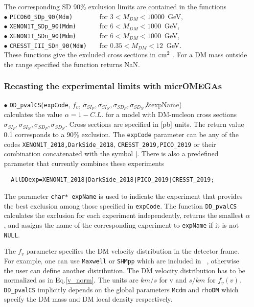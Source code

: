 \documentclass[12pt,a4paper]{article}
\begin{document}
The corresponding SD 90\% exclusion limits are contained in the functions\\

\noindent 
$\bullet$ \verb|PICO60_SDp_90(Mdm)       | for  $ 3 < M_{DM} < 10000$~GeV,  \cite{Amole:2019fdf} \\
\noindent
$\bullet$ \verb|XENON1T_SDp_90(Mdm)      | for  $ 6 <  M_{DM} < 1000$~GeV, \cite{Aprile:2019dbj} \\
\noindent
$\bullet$ \verb|XENON1T_SDn_90(Mdm)      | for  $ 6 <  M_{DM} < 1000$~GeV, \cite{Aprile:2019dbj} \\
\noindent
$\bullet$ \verb|CRESST_III_SDn_90(Mdm)   |  for $ 0.35 < M_{DM} < 12$~GeV. ~\cite{Abdelhameed:2019hmk}\\


These functions give the  excluded cross sections in ${\rm cm}^2$ . For a DM mass outside the range specified the function returns NaN.

\subsubsection{Recasting the experimental limits with  micrOMEGAs}  
\label{Recasting}


\noindent
$\bullet$ \verb|DD_pvalCS|(\verb|expCode|, $f_v$, $\sigma_{SI_P},\sigma_{SI_N},\sigma_{SD_P}, \sigma_{SD_N}$,\&expName)\\
calculates the  value $\alpha= 1-C.L.$  for a model with DM-nucleon cross sections 
$\sigma_{SI_P},\sigma_{SI_N},\sigma_{SD_P}, \sigma_{SD_N}$. Cross sections are specified in
[pb] units. The return value 0.1 corresponds to a 90\% exclusion.   
 The {\tt expCode} parameter can be any of the codes  \verb|XENON1T_2018,DarkSide_2018|, \verb|CRESST_2019,PICO_2019| or their combination concatenated with the symbol
$\mid$. There is also a predefined parameter that  currently combines these experiments 
\begin{verbatim}
  AllDDexp=XENON1T_2018|DarkSide_2018|PICO_2019|CRESST_2019;
\end{verbatim}

The parameter {\tt char* expName}  is used to indicate the   experiment that  provides
the best exclusion among those specified in  {\tt expCode}.   The function {\tt DD\_pvalCS } calculates the
exclusion for each experiment  independently, returns the smallest $\alpha$, and assigns the 
name of the corresponding experiment to  {\tt expName}  if it is not {\tt NULL}.  

The $f_v$ parameter specifies the DM velocity distribution in the detector frame. For
example, one can use   {\tt Maxwell} or {\tt SHMpp} which are
included in \micro~, 
otherwise the user can define another distribution.   
The DM velocity distribution  has to be normalized  as in Eq.\ref{v_norm}.
 The units  are $km/s$ for v and $s/km$ for  $f_v(v)$. {\tt DD\_pvalCS} implicitly depends on the 
global parameters  {\tt Mcdm}  and  {\tt rhoDM} which specify the DM mass and DM  local density respectively.
\end{document}
